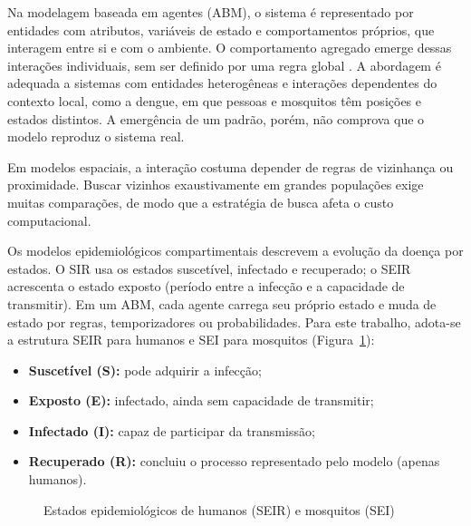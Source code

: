 Na modelagem baseada em agentes (ABM), o sistema é representado por entidades com atributos, variáveis de estado e comportamentos próprios, que interagem entre si e com o ambiente. O comportamento agregado emerge dessas interações individuais, sem ser definido por uma regra global \cite{Macal2010}. A abordagem é adequada a sistemas com entidades heterogêneas e interações dependentes do contexto local, como a dengue, em que pessoas e mosquitos têm posições e estados distintos. A emergência de um padrão, porém, não comprova que o modelo reproduz o sistema real.

Em modelos espaciais, a interação costuma depender de regras de vizinhança ou proximidade. Buscar vizinhos exaustivamente em grandes populações exige muitas comparações, de modo que a estratégia de busca afeta o custo computacional.

Os modelos epidemiológicos compartimentais descrevem a evolução da doença por estados. O SIR usa os estados suscetível, infectado e recuperado; o SEIR acrescenta o estado exposto (período entre a infecção e a capacidade de transmitir). Em um ABM, cada agente carrega seu próprio estado e muda de estado por regras, temporizadores ou probabilidades. Para este trabalho, adota-se a estrutura SEIR para humanos e SEI para mosquitos (Figura~\ref{fig:seir}):

\begin{itemize}
    \item \textbf{Suscetível (S):} pode adquirir a infecção;
    \item \textbf{Exposto (E):} infectado, ainda sem capacidade de transmitir;
    \item \textbf{Infectado (I):} capaz de participar da transmissão;
    \item \textbf{Recuperado (R):} concluiu o processo representado pelo modelo (apenas humanos).
\end{itemize}

\begin{figure}[htb]
    \centering
    \caption{Estados epidemiológicos de humanos (SEIR) e mosquitos (SEI)}
    \label{fig:seir}
\end{figure}

